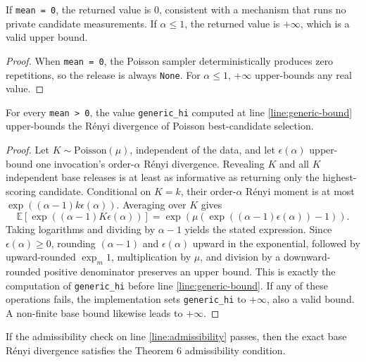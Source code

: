 \documentclass{article}
\begin{document}
\begin{lemma}
\label{special-cases}
If \texttt{mean = 0}, the returned value is $0$, consistent with a mechanism that
runs no private candidate measurements.
If $\alpha \le 1$, the returned value is $+\infty$, which is a valid upper bound.
\end{lemma}

\begin{proof}
When \texttt{mean = 0}, the Poisson sampler deterministically produces zero repetitions,
so the release is always \texttt{None}.
For $\alpha \le 1$, $+\infty$ upper-bounds any real value.
\end{proof}

\begin{lemma}
\label{generic}
For every \texttt{mean > 0}, the value \texttt{generic\_hi} computed at
line \ref{line:generic-bound} upper-bounds the Rényi divergence of Poisson
best-candidate selection.
\end{lemma}

\begin{proof}
Let $K\sim\mathrm{Poisson}(\mu)$, independent of the data, and let
$\epsilon(\alpha)$ upper-bound one invocation's order-$\alpha$ Rényi divergence.
Revealing $K$ and all $K$ independent base releases is at least as informative
as returning only the highest-scoring candidate. Conditional on $K=k$, their
order-$\alpha$ Rényi moment is at most
$\exp((\alpha-1)k\epsilon(\alpha))$. Averaging over $K$ gives
\[
\mathbb E[\exp((\alpha-1)K\epsilon(\alpha))]
=\exp\left(\mu(\exp((\alpha-1)\epsilon(\alpha))-1)\right).
\]
Taking logarithms and dividing by $\alpha-1$ yields the stated expression.
Since $\epsilon(\alpha)\ge0$, rounding $(\alpha-1)$ and $\epsilon(\alpha)$
upward in the exponential, followed by upward-rounded $\exp_m1$, multiplication
by $\mu$, and division by a downward-rounded positive denominator preserves an
upper bound. This is exactly the computation of \texttt{generic\_hi} before line
\ref{line:generic-bound}. If any of these operations fails, the
implementation sets \texttt{generic\_hi} to $+\infty$, also a valid bound.
A non-finite base bound likewise leads to $+\infty$.
\end{proof}

\begin{lemma}
\label{admissibility}
If the admissibility check on line \ref{line:admissibility} passes, then the exact base Rényi
divergence satisfies the Theorem 6 admissibility condition.
\end{lemma}
\end{document}

